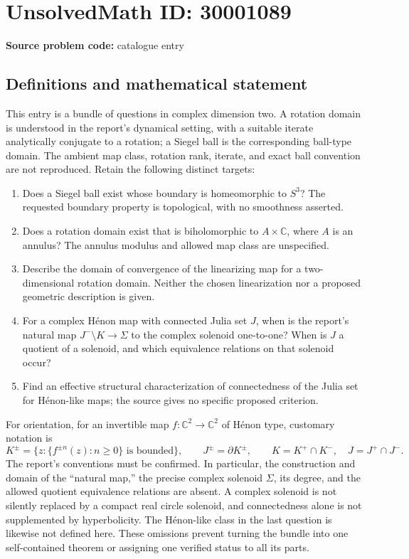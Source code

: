 \documentclass[11pt]{article}
\newcommand{\C}{\mathbb{C}}
\begin{document}
\section*{UnsolvedMath ID: 30001089}
\textbf{Source problem code:} catalogue entry
\subsection{Definitions and mathematical statement}
This entry is a bundle of questions in complex dimension two. A rotation domain is understood in the report's dynamical setting, with a suitable iterate analytically conjugate to a rotation; a Siegel ball is the corresponding ball-type domain. The ambient map class, rotation rank, iterate, and exact ball convention are not reproduced. Retain the following distinct targets:
\begin{enumerate}
\item Does a Siegel ball exist whose boundary is homeomorphic to \(S^3\)? The requested boundary property is topological, with no smoothness asserted.
\item Does a rotation domain exist that is biholomorphic to \(A\times\C\), where \(A\) is an annulus? The annulus modulus and allowed map class are unspecified.
\item Describe the domain of convergence of the linearizing map for a two-dimensional rotation domain. Neither the chosen linearization nor a proposed geometric description is given.
\item For a complex H\'enon map with connected Julia set \(J\), when is the report's natural map \(J^-\setminus K\to\Sigma\) to the complex solenoid one-to-one? When is \(J\) a quotient of a solenoid, and which equivalence relations on that solenoid occur?
\item Find an effective structural characterization of connectedness of the Julia set for H\'enon-like maps; the source gives no specific proposed criterion.
\end{enumerate}
For orientation, for an invertible map \(f:\C^2\to\C^2\) of H\'enon type, customary notation is
\[
K^\pm=\{z:\{f^{\pm n}(z):n\geq0\}\text{ is bounded}\},\qquad
J^\pm=\partial K^\pm,\qquad
K=K^+\cap K^-,\quad J=J^+\cap J^-.
\]
The report's conventions must be confirmed. In particular, the construction and domain of the ``natural map,'' the precise complex solenoid \(\Sigma\), its degree, and the allowed quotient equivalence relations are absent. A complex solenoid is not silently replaced by a compact real circle solenoid, and connectedness alone is not supplemented by hyperbolicity. The H\'enon-like class in the last question is likewise not defined here. These omissions prevent turning the bundle into one self-contained theorem or assigning one verified status to all its parts.
\end{document}
